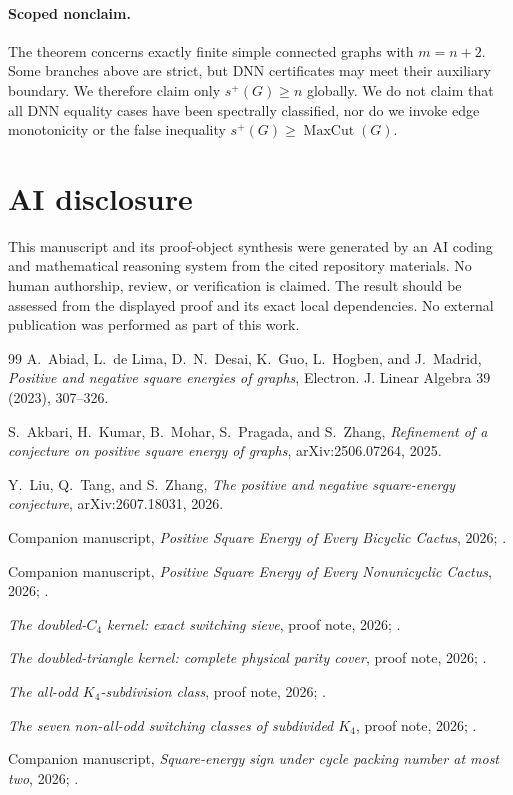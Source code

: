 \documentclass[11pt]{article}
\theoremstyle{remark}
\newcommand{\splus}{s^+}
\begin{document}
\paragraph{Scoped nonclaim.}
The theorem concerns exactly finite simple connected graphs with $m=n+2$.
Some branches above are strict, but DNN certificates may meet their auxiliary
boundary.  We therefore claim only $\splus(G)\geq n$ globally.  We do not claim
that all DNN equality cases have been spectrally classified, nor do we invoke
edge monotonicity or the false inequality $\splus(G)\geq\operatorname{MaxCut}(G)$.

\section*{AI disclosure}
This manuscript and its proof-object synthesis were generated by an AI coding
and mathematical reasoning system from the cited repository materials.  No
human authorship, review, or verification is claimed.  The result should be
assessed from the displayed proof and its exact local dependencies.  No
external publication was performed as part of this work.

\begin{thebibliography}{99}
A.~Abiad, L.~de Lima, D.~N.~Desai, K.~Guo, L.~Hogben, and J.~Madrid,
\emph{Positive and negative square energies of graphs},
Electron. J. Linear Algebra 39 (2023), 307--326.

S.~Akbari, H.~Kumar, B.~Mohar, S.~Pragada, and S.~Zhang,
\emph{Refinement of a conjecture on positive square energy of graphs},
arXiv:2506.07264, 2025.

Y.~Liu, Q.~Tang, and S.~Zhang,
\emph{The positive and negative square-energy conjecture},
arXiv:2607.18031, 2026.

Companion manuscript, \emph{Positive Square Energy of Every Bicyclic Cactus},
2026; .

Companion manuscript, \emph{Positive Square Energy of Every Nonunicyclic
Cactus}, 2026; .

\emph{The doubled-$C_4$ kernel: exact switching sieve}, proof note, 2026;
.

\emph{The doubled-triangle kernel: complete physical parity cover}, proof note,
2026; .

\emph{The all-odd $K_4$-subdivision class}, proof note, 2026;
.

\emph{The seven non-all-odd switching classes of subdivided $K_4$}, proof
note, 2026;
.

Companion manuscript, \emph{Square-energy sign under cycle packing number at
most two}, 2026; .
\end{thebibliography}
\end{document}
